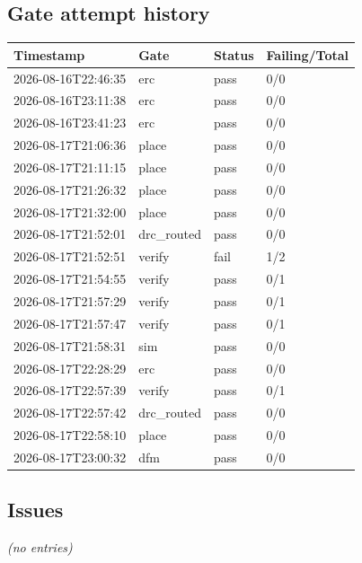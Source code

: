 \documentclass[11pt,a4paper]{article}
\begin{document}
\subsection*{Gate attempt history}
{\small
\begin{longtable}{llll}
\toprule
\textbf{Timestamp} & \textbf{Gate} & \textbf{Status} & \textbf{Failing/Total} \\
\midrule
\endhead
2026-08-16T22:46:35 & erc & pass & 0/0 \\
2026-08-16T23:11:38 & erc & pass & 0/0 \\
2026-08-16T23:41:23 & erc & pass & 0/0 \\
2026-08-17T21:06:36 & place & pass & 0/0 \\
2026-08-17T21:11:15 & place & pass & 0/0 \\
2026-08-17T21:26:32 & place & pass & 0/0 \\
2026-08-17T21:32:00 & place & pass & 0/0 \\
2026-08-17T21:52:01 & drc\_routed & pass & 0/0 \\
2026-08-17T21:52:51 & verify & fail & 1/2 \\
2026-08-17T21:54:55 & verify & pass & 0/1 \\
2026-08-17T21:57:29 & verify & pass & 0/1 \\
2026-08-17T21:57:47 & verify & pass & 0/1 \\
2026-08-17T21:58:31 & sim & pass & 0/0 \\
2026-08-17T22:28:29 & erc & pass & 0/0 \\
2026-08-17T22:57:39 & verify & pass & 0/1 \\
2026-08-17T22:57:42 & drc\_routed & pass & 0/0 \\
2026-08-17T22:58:10 & place & pass & 0/0 \\
2026-08-17T23:00:32 & dfm & pass & 0/0 \\
\bottomrule
\end{longtable}
}
\subsection*{Issues}
\emph{(no entries)}
\end{document}

